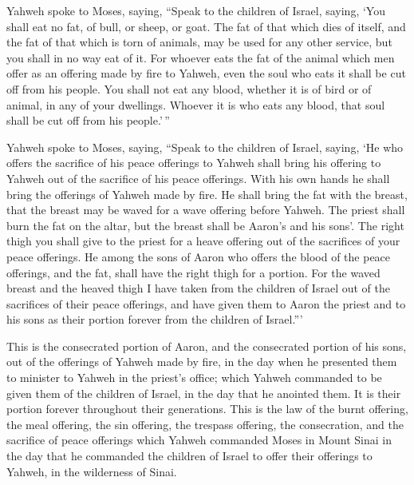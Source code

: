  Yahweh spoke to Moses, saying,  ``Speak to
the children of Israel, saying, `You shall eat no fat, of bull, or
sheep, or goat.  The fat of that which dies of itself, and
the fat of that which is torn of animals, may be used for any other
service, but you shall in no way eat of it.  For whoever
eats the fat of the animal which men offer as an offering made by fire
to Yahweh, even the soul who eats it shall be cut off from his people.
 You shall not eat any blood, whether it is of bird or of
animal, in any of your dwellings.  Whoever it is who eats
any blood, that soul shall be cut off from his people.'\,''

 Yahweh spoke to Moses, saying,  ``Speak to
the children of Israel, saying, `He who offers the sacrifice of his
peace offerings to Yahweh shall bring his offering to Yahweh out of the
sacrifice of his peace offerings.  With his own hands he
shall bring the offerings of Yahweh made by fire. He shall bring the fat
with the breast, that the breast may be waved for a wave offering before
Yahweh.  The priest shall burn the fat on the altar, but
the breast shall be Aaron's and his sons'.  The right thigh
you shall give to the priest for a heave offering out of the sacrifices
of your peace offerings.  He among the sons of Aaron who
offers the blood of the peace offerings, and the fat, shall have the
right thigh for a portion.  For the waved breast and the
heaved thigh I have taken from the children of Israel out of the
sacrifices of their peace offerings, and have given them to Aaron the
priest and to his sons as their portion forever from the children of
Israel.'''

 This is the consecrated portion of Aaron, and the
consecrated portion of his sons, out of the offerings of Yahweh made by
fire, in the day when he presented them to minister to Yahweh in the
priest's office;  which Yahweh commanded to be given them
of the children of Israel, in the day that he anointed them. It is their
portion forever throughout their generations.  This is the
law of the burnt offering, the meal offering, the sin offering, the
trespass offering, the consecration, and the sacrifice of peace
offerings  which Yahweh commanded Moses in Mount Sinai in
the day that he commanded the children of Israel to offer their
offerings to Yahweh, in the wilderness of Sinai.


